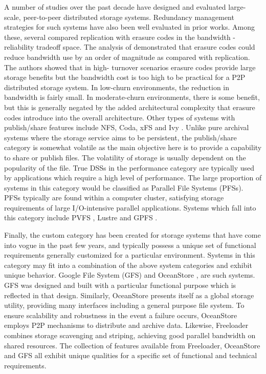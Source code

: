 \documentclass[11pt]{article}
\begin{document}
A number of studies over the past decade have designed and evaluated
large- scale, peer-to-peer distributed storage systems. Redundancy
management strategies for such systems have also been well evaluated
in prior works.  Among these, several compared replication with
erasure codes in the bandwidth -reliability tradeoff space. The
analysis of \cite{Weatherspoon:2002} demonstrated that erasure
codes could reduce bandwidth use by an order of magnitude as compared
with replication. The authors showed that in high- turnover scenarios
erasure codes provide large storage benefits but the bandwidth cost is
too high to be practical for a P2P distributed storage system. In
low-churn environments, the reduction in bandwidth is fairly small. In
moderate-churn environments, there is some benefit, but this is
generally negated by the added architectural complexity that erasure
codes introduce into the overall architecture. Other types of systems
with publish/share features include NFS, Coda, xFS and Ivy
\cite{Muthitacharoen:2002}. Unlike pure archival systems where the
storage service aims to be persistent, the publish/share category is
somewhat volatile as the main objective here is to provide a
capability to share or publish files. The volatility of storage is
usually dependent on the popularity of the file. True DSSs in the
performance category are typically used by applications which require
a high level of performance. The large proportion of systems in this
category would be classified as Parallel File Systems (PFSs).  PFSs
typically are found within a computer cluster, satisfying storage
requirements of large I/O-intensive parallel applications.  Systems
which fall into this category include PVFS \cite{Carns:2002}, Lustre
\cite{Braam:LustreWhite} and GPFS \cite{Schmuck:2002}.

Finally, the custom category has been created for storage systems that
have come into vogue in the past few years, and typically possess a
unique set of functional requirements generally customized for a
particular environment.  Systems in this category may fit into a
combination of the above system categories and exhibit unique
behavior. Google File System (GFS) \cite{Ghemawat:2003} and
OceanStore \cite{Kubiatowicz:2000,Rhea:2003}, are such
systems. GFS was designed and built with a particular functional
purpose which is reflected in that design. Similarly, OceanStore
presents itself as a global storage utility, providing many interfaces
including a general purpose file system. To ensure scalability and
robustness in the event a failure occurs, OceanStore employs P2P
mechanisms to distribute and archive data. Likewise, Freeloader
\cite{Vazhkudai:2005} combines storage scavenging and striping,
achieving good parallel bandwidth on shared resources. The collection
of features available from Freeloader, OceanStore and GFS all exhibit
unique qualities for a specific set of functional and technical
requirements.
\end{document}
